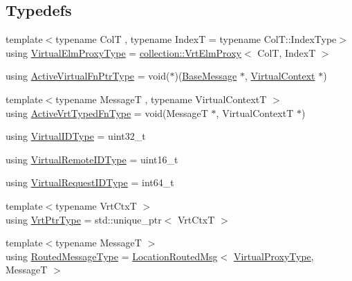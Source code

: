\subsection*{Typedefs}
\begin{DoxyCompactItemize}
\item 
{\footnotesize template$<$typename ColT , typename IndexT  = typename Col\+T\+::\+Index\+Type$>$ }\\using \hyperlink{namespacevt_1_1vrt_a620a5c8c59d13e513f690c74b4af516f}{Virtual\+Elm\+Proxy\+Type} = \hyperlink{structvt_1_1vrt_1_1collection_1_1_vrt_elm_proxy}{collection\+::\+Vrt\+Elm\+Proxy}$<$ ColT, IndexT $>$
\item 
using \hyperlink{namespacevt_1_1vrt_a53c67fe3c204169d703b59fc9fd3f06c}{Active\+Virtual\+Fn\+Ptr\+Type} = void($\ast$)(\hyperlink{namespacevt_ac34f95a5e2b8109b55bfba52b074443d}{Base\+Message} $\ast$, \hyperlink{structvt_1_1vrt_1_1_virtual_context}{Virtual\+Context} $\ast$)
\item 
{\footnotesize template$<$typename MessageT , typename Virtual\+ContextT $>$ }\\using \hyperlink{namespacevt_1_1vrt_a14077459ea3367e5834151d314ff4bc8}{Active\+Vrt\+Typed\+Fn\+Type} = void(MessageT $\ast$, Virtual\+ContextT $\ast$)
\item 
using \hyperlink{namespacevt_1_1vrt_a84d0891f52f70728c3fc2172cffb464b}{Virtual\+I\+D\+Type} = uint32\+\_\+t
\item 
using \hyperlink{namespacevt_1_1vrt_a8184ab8c530ce523edcdc4f4c38565be}{Virtual\+Remote\+I\+D\+Type} = uint16\+\_\+t
\item 
using \hyperlink{namespacevt_1_1vrt_ac7ef8820ebfc383fa16f09bf46eaa2b8}{Virtual\+Request\+I\+D\+Type} = int64\+\_\+t
\item 
{\footnotesize template$<$typename Vrt\+CtxT $>$ }\\using \hyperlink{namespacevt_1_1vrt_a5567b830b7fd81a29e7d3593511721b9}{Vrt\+Ptr\+Type} = std\+::unique\+\_\+ptr$<$ Vrt\+CtxT $>$
\item 
{\footnotesize template$<$typename MessageT $>$ }\\using \hyperlink{namespacevt_1_1vrt_a00a8c6e49603fd62cd0a3fbd99277e36}{Routed\+Message\+Type} = \hyperlink{namespacevt_a0cb65f2151629893480ef391def4e733}{Location\+Routed\+Msg}$<$ \hyperlink{namespacevt_a1b417dd5d684f045bb58a0ede70045ac}{Virtual\+Proxy\+Type}, MessageT $>$
\end{DoxyCompactItemize}
